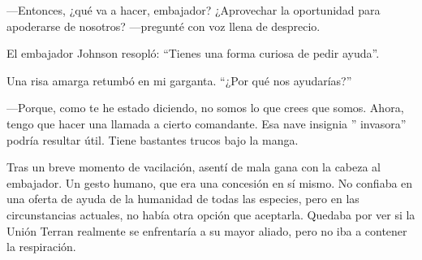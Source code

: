 —Entonces, ¿qué va a hacer, embajador? ¿Aprovechar la oportunidad para apoderarse de nosotros? —pregunté con voz llena de desprecio.

El embajador Johnson resopló: ``Tienes una forma curiosa de pedir ayuda''.

Una risa amarga retumbó en mi garganta. ``¿Por qué nos ayudarías?''


—Porque, como te he estado diciendo, no somos lo que crees que somos. Ahora, tengo que hacer una llamada a cierto comandante. Esa nave insignia ''
invasora''
 podría resultar útil. Tiene bastantes trucos bajo la manga.

Tras un breve momento de vacilación, asentí de mala gana con la cabeza al embajador. Un gesto humano, que era una concesión en sí mismo. No confiaba en una oferta de ayuda de la humanidad de todas las especies, pero en las circunstancias actuales, no había otra opción que aceptarla. Quedaba por ver si la Unión Terran realmente se enfrentaría a su mayor aliado, pero no iba a contener la respiración.
